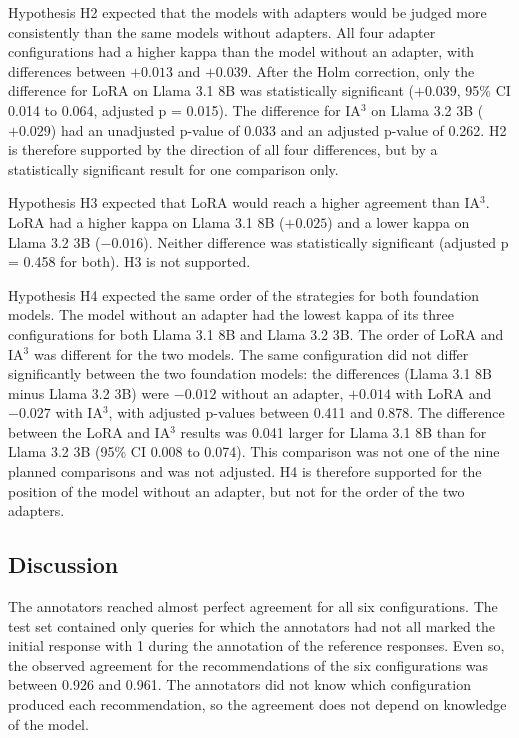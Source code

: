 \documentclass[journal,article,submit,pdftex,moreauthors]{Definitions/mdpi}
\begin{document}
Hypothesis H2 expected that the models with adapters would be judged more consistently than the same models without adapters. All four adapter configurations had a higher kappa than the model without an adapter, with differences between $+0.013$ and $+0.039$. After the Holm correction, only the difference for LoRA on Llama 3.1 8B was statistically significant ($+0.039$, 95\% CI 0.014 to 0.064, adjusted p = 0.015). The difference for IA$^3$ on Llama 3.2 3B ($+0.029$) had an unadjusted p-value of 0.033 and an adjusted p-value of 0.262. H2 is therefore supported by the direction of all four differences, but by a statistically significant result for one comparison only.

Hypothesis H3 expected that LoRA would reach a higher agreement than IA$^3$. LoRA had a higher kappa on Llama 3.1 8B ($+0.025$) and a lower kappa on Llama 3.2 3B ($-0.016$). Neither difference was statistically significant (adjusted p = 0.458 for both). H3 is not supported.

Hypothesis H4 expected the same order of the strategies for both foundation models. The model without an adapter had the lowest kappa of its three configurations for both Llama 3.1 8B and Llama 3.2 3B. The order of LoRA and IA$^3$ was different for the two models. The same configuration did not differ significantly between the two foundation models: the differences (Llama 3.1 8B minus Llama 3.2 3B) were $-0.012$ without an adapter, $+0.014$ with LoRA and $-0.027$ with IA$^3$, with adjusted p-values between 0.411 and 0.878. The difference between the LoRA and IA$^3$ results was 0.041 larger for Llama 3.1 8B than for Llama 3.2 3B (95\% CI 0.008 to 0.074). This comparison was not one of the nine planned comparisons and was not adjusted. H4 is therefore supported for the position of the model without an adapter, but not for the order of the two adapters.

\subsection{Discussion}\label{sec:discussion}
The annotators reached almost perfect agreement for all six configurations. The test set contained only queries for which the annotators had not all marked the initial response with 1 during the annotation of the reference responses. Even so, the observed agreement for the recommendations of the six configurations was between 0.926 and 0.961. The annotators did not know which configuration produced each recommendation, so the agreement does not depend on knowledge of the model.
\end{document}
